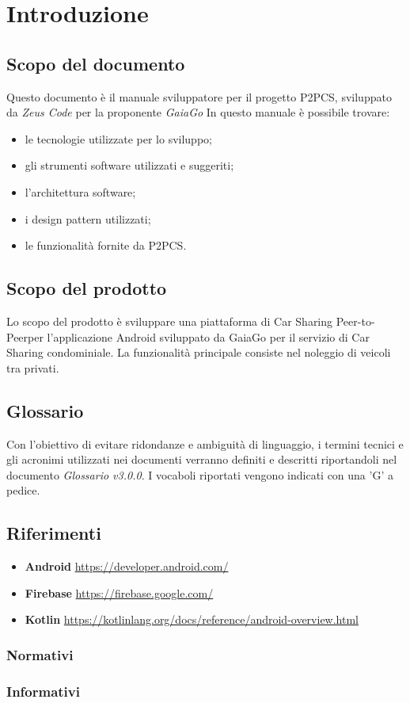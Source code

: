 \section{Introduzione} 
\subsection{Scopo del documento}
Questo documento è il manuale sviluppatore per il progetto P2PCS, sviluppato da \textit{Zeus Code} per la proponente \textit{GaiaGo}
In questo manuale è possibile trovare:
\begin{itemize}
	\item le tecnologie utilizzate per lo sviluppo;
	\item gli strumenti software utilizzati e suggeriti;
	\item l'architettura software;
	\item i design pattern utilizzati;
	\item le funzionalità fornite da P2PCS.
\end{itemize}
\subsection{Scopo del prodotto}
Lo scopo del prodotto è sviluppare una piattaforma di Car Sharing Peer-to-Peer\glosp per l'applicazione Android sviluppato da GaiaGo per il servizio di Car Sharing condominiale. La funzionalità principale consiste nel noleggio di veicoli tra privati.
\subsection{Glossario}
Con l’obiettivo di evitare ridondanze e ambiguità di linguaggio, i termini tecnici e gli acronimi utilizzati nei documenti verranno definiti e descritti riportandoli nel documento \textit{Glossario v3.0.0}.  I vocaboli riportati vengono indicati con una 'G' a pedice.
\subsection{Riferimenti}
\begin{itemize}
	\item \textbf{Android} \url{https://developer.android.com/}
	\item \textbf{Firebase} \url{https://firebase.google.com/}
	\item \textbf{Kotlin} \url{https://kotlinlang.org/docs/reference/android-overview.html}
	
\end{itemize}
\subsubsection{Normativi}

\subsubsection{Informativi}
